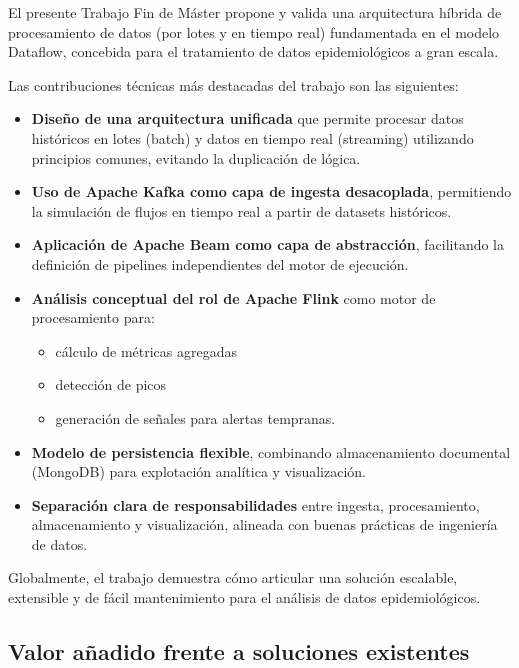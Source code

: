 \documentclass[12pt,a4paper]{article}
\providecommand{\tightlist}{%
  \setlength{\itemsep}{0pt}\setlength{\parskip}{0pt}}
\begin{document}
El presente Trabajo Fin de Máster propone y valida una arquitectura híbrida de procesamiento de datos (por lotes y en tiempo real) fundamentada en el modelo Dataflow, concebida para el tratamiento de datos epidemiológicos a gran escala.

Las contribuciones técnicas más destacadas del trabajo son las siguientes:

\begin{itemize}
    \tightlist
    \item
          \textbf{Diseño de una arquitectura unificada} que permite procesar datos históricos en lotes (batch) y datos en tiempo real (streaming) utilizando principios comunes, evitando la duplicación de lógica.
    \item
          \textbf{Uso de Apache Kafka como capa de ingesta desacoplada}, permitiendo la simulación de flujos en tiempo real a partir de datasets históricos.
    \item
          \textbf{Aplicación de Apache Beam como capa de abstracción}, facilitando la definición de pipelines independientes del motor de ejecución.
    \item
          \textbf{Análisis conceptual del rol de Apache Flink} como motor de procesamiento para:

          \begin{itemize}
              \tightlist
              \item
                    cálculo de métricas agregadas
              \item
                    detección de picos
              \item
                    generación de señales para alertas tempranas.
          \end{itemize}
    \item
          \textbf{Modelo de persistencia flexible}, combinando almacenamiento documental (MongoDB) para explotación analítica y visualización.
    \item
          \textbf{Separación clara de responsabilidades} entre ingesta, procesamiento, almacenamiento y visualización, alineada con buenas prácticas de ingeniería de datos.
\end{itemize}

Globalmente, el trabajo demuestra cómo articular una solución escalable, extensible y de fácil mantenimiento para el análisis de datos epidemiológicos.

\subsection{Valor añadido frente a soluciones existentes}\label{valor-auxf1adido-frente-a-soluciones-existentes}
\end{document}
